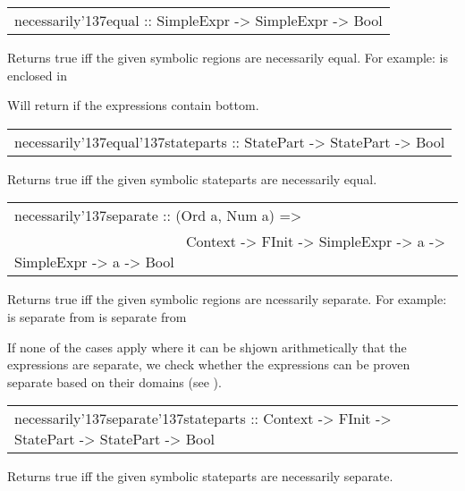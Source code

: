 \begin{haddockdesc}
\item[\begin{tabular}{@{}l}
necessarily{\char '137}equal :: SimpleExpr -> SimpleExpr -> Bool
\end{tabular}]
{\haddockbegindoc
Returns true iff the given symbolic regions are necessarily equal.
 For example:
     is enclosed in \par
Will return  if the expressions contain bottom.\par}
\end{haddockdesc}
\begin{haddockdesc}
\item[\begin{tabular}{@{}l}
necessarily{\char '137}equal{\char '137}stateparts :: StatePart -> StatePart -> Bool
\end{tabular}]
{\haddockbegindoc
Returns true iff the given symbolic stateparts are necessarily equal.\par}
\end{haddockdesc}
\begin{haddockdesc}
\item[\begin{tabular}{@{}l}
necessarily{\char '137}separate :: (Ord a, Num a) =>\\\ \ \ \ \ \ \ \ \ \ \ \ \ \ \ \ \ \ \ \ \ \ \ \ Context -> FInit -> SimpleExpr -> a -> SimpleExpr -> a -> Bool
\end{tabular}]
{\haddockbegindoc
Returns true iff the given symbolic regions are ncessarily separate.
 For example:
     is separate from 
     is separate from \par
If none of the cases apply where it can be shjown arithmetically that the expressions are separate,
 we check whether the expressions can be proven separate based on their domains (see ).\par}
\end{haddockdesc}
\begin{haddockdesc}
\item[\begin{tabular}{@{}l}
necessarily{\char '137}separate{\char '137}stateparts :: Context -> FInit -> StatePart -> StatePart -> Bool
\end{tabular}]
{\haddockbegindoc
Returns true iff the given symbolic stateparts are necessarily separate.\par}
\end{haddockdesc}
